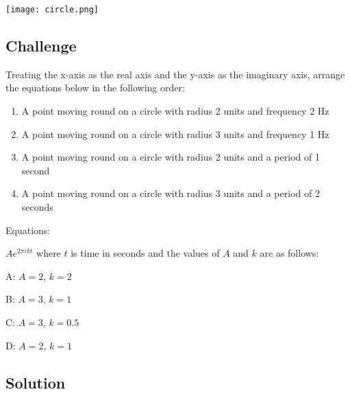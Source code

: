 \texttt{[image: circle.png]}

\subsection*{Challenge}
Treating the x-axis as the real axis and the y-axis as the imaginary axis, arrange the equations below in the following order:

\begin{enumerate}
    \item A point moving round on a circle with radius 2 units and frequency 2 Hz
    \item A point moving round on a circle with radius 3 units and frequency 1 Hz
    \item A point moving round on a circle with radius 2 units and a period of 1 second
    \item A point moving round on a circle with radius 3 units and a period of 2 seconds
\end{enumerate}

Equations:

$\displaystyle A e^{2 \pi i k t}$ where $t$ is time in seconds and the values of $A$ and $k$ are as follows:

A: $A=2$, $k=2$ 

B: $A=3$, $k=1$

C: $A=3$, $k=0.5$

D: $A=2$, $k=1$

\subsection*{Solution}





\fi

